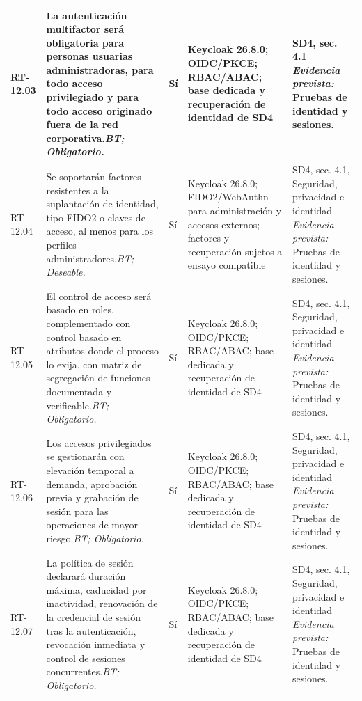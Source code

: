 \begin{paginaHorizontalSynaptix}
\begin{longtable}{|L{0.09\AnchoMatrizTDoce}|L{0.385\AnchoMatrizTDoce}|L{0.065\AnchoMatrizTDoce}|L{0.18\AnchoMatrizTDoce}|L{0.28\AnchoMatrizTDoce}|}
RT-\allowbreak{}12.\allowbreak{}03 &
La autenticación multifactor será obligatoria para personas usuarias administradoras, para todo acceso privilegiado y para todo acceso originado fuera de la red corporativa.\newline\textit{BT; Obligatorio.} &
Sí &
Keycloak 26.8.0; OIDC/PKCE; RBAC/ABAC; base dedicada y recuperación de identidad de SD4 &
SD4, sec. 4.1 \newline\textit{Evidencia prevista:} Pruebas de identidad y sesiones. \\ \hline

RT-\allowbreak{}12.\allowbreak{}04 &
Se soportarán factores resistentes a la suplantación de identidad, tipo FIDO2 o claves de acceso, al menos para los perfiles administradores.\newline\textit{BT; Deseable.} &
Sí &
Keycloak 26.8.0; FIDO2/WebAuthn para administración y accesos externos; factores y recuperación sujetos a ensayo compatible &
SD4, sec. 4.1, Seguridad, privacidad e identidad \newline\textit{Evidencia prevista:} Pruebas de identidad y sesiones. \\ \hline

RT-\allowbreak{}12.\allowbreak{}05 &
El control de acceso será basado en roles, complementado con control basado en atributos donde el proceso lo exija, con matriz de segregación de funciones documentada y verificable.\newline\textit{BT; Obligatorio.} &
Sí &
Keycloak 26.8.0; OIDC/PKCE; RBAC/ABAC; base dedicada y recuperación de identidad de SD4 &
SD4, sec. 4.1, Seguridad, privacidad e identidad \newline\textit{Evidencia prevista:} Pruebas de identidad y sesiones. \\ \hline

RT-\allowbreak{}12.\allowbreak{}06 &
Los accesos privilegiados se gestionarán con elevación temporal a demanda, aprobación previa y grabación de sesión para las operaciones de mayor riesgo.\newline\textit{BT; Obligatorio.} &
Sí &
Keycloak 26.8.0; OIDC/PKCE; RBAC/ABAC; base dedicada y recuperación de identidad de SD4 &
SD4, sec. 4.1, Seguridad, privacidad e identidad \newline\textit{Evidencia prevista:} Pruebas de identidad y sesiones. \\ \hline

RT-\allowbreak{}12.\allowbreak{}07 &
La política de sesión declarará duración máxima, caducidad por inactividad, renovación de la credencial de sesión tras la autenticación, revocación inmediata y control de sesiones concurrentes.\newline\textit{BT; Obligatorio.} &
Sí &
Keycloak 26.8.0; OIDC/PKCE; RBAC/ABAC; base dedicada y recuperación de identidad de SD4 &
SD4, sec. 4.1, Seguridad, privacidad e identidad \newline\textit{Evidencia prevista:} Pruebas de identidad y sesiones. \\ \hline


\end{longtable}
\end{paginaHorizontalSynaptix}
